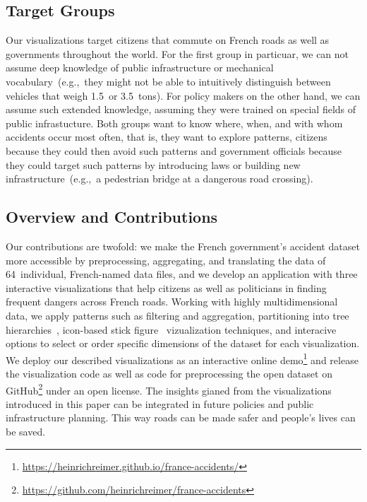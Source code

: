 \subsection{Target Groups}
Our visualizations target citizens that commute on French roads as well as governments throughout the world. For the first group in particuar, we can not assume deep knowledge of public infrastructure or mechanical vocabulary~(e.g.,~they might not be able to intuitively distinguish between vehicles that weigh 1.5~or 3.5~tons). For policy makers on the other hand, we can assume such extended knowledge, assuming they were trained on special fields of public infrastucture. Both groups want to know where, when, and with whom accidents occur most often, that is, they want to explore patterns, citizens because they could then avoid such patterns and government officials because they could target such patterns by introducing laws or building new infrastructure~(e.g.,~a pedestrian bridge at a dangerous road crossing). 

\subsection{Overview and Contributions}
Our contributions are twofold: \Ni we make the French government's accident dataset more accessible by preprocessing, aggregating, and translating the data of 64~individual, French-named data files, and \Nii we develop an application with three interactive visualizations that help citizens as well as politicians in finding frequent dangers across French roads.
Working with highly multidimensional data, we apply patterns such as filtering and aggregation, partitioning into tree hierarchies~\cite{Shneiderman1992}, icon-based stick figure~\cite{PickettG1988} vizualization techniques, and interacive options to select or order specific dimensions of the dataset for each visualization.
We deploy our described visualizations as an interactive online demo\footnote{\url{https://heinrichreimer.github.io/france-accidents/}} and release the visualization code as well as code for preprocessing the open dataset on GitHub\footnote{\url{https://github.com/heinrichreimer/france-accidents}} under an open license.
The insights gianed from the visualizations introduced in this paper can be integrated in future policies and public infrastructure planning. This way roads can be made safer and people's lives can be saved.
